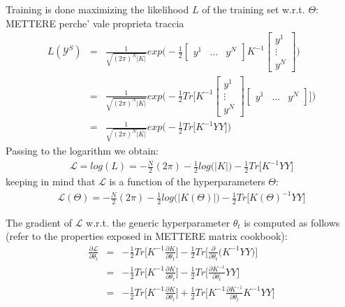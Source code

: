 \documentclass{article}
\begin{document}
Training is done maximizing the likelihood $L$ of the training set w.r.t. $\Theta$:
METTERE perche' vale proprieta traccia
\begin{eqnarray}
L(\mathcal{Y}^S) &=& 
\frac{1}{\sqrt{(2 \pi)^N \left | K \right | }}
exp \bigg ( - \frac{1}{2}
\begin{bmatrix} y^1 & \hdots & y^N \end{bmatrix} 
K^{-1}
\begin{bmatrix} y^1 \\ \vdots \\ y^N \end{bmatrix} 
\bigg ) \\
&=& 
\frac{1}{\sqrt{(2 \pi)^N \left | K \right | }}
exp \bigg ( - \frac{1}{2}
Tr \bigg [ 
K^{-1}
\begin{bmatrix} y^1 \\ \vdots \\ y^N \end{bmatrix} 
\begin{bmatrix} y^1 & \hdots & y^N \end{bmatrix} 
\bigg ]
\bigg ) \\
&=&
\frac{1}{\sqrt{(2 \pi)^N \left | K \right | }}
exp \bigg ( - \frac{1}{2}
Tr \bigg [ 
K^{-1}
YY
\bigg ]
\bigg )
\end{eqnarray}
Passing to the logarithm we obtain:
\begin{eqnarray}
\mathcal{L} = log(L) = 
-\frac{N}{2}(2 \pi) 
-\frac{1}{2} log \big (\left | K \right | \big )
-\frac{1}{2} Tr \bigg [
K^{-1} YY
\bigg ] 
\end{eqnarray}
keeping in mind that $\mathcal{L}$ is a function of the hyperparameters $\Theta$:
\begin{eqnarray}
\mathcal{L}(\Theta) = 
-\frac{N}{2}(2 \pi) 
-\frac{1}{2} log \big (\left | K(\Theta) \right | \big )
-\frac{1}{2} Tr \bigg [
K(\Theta)^{-1} YY
\bigg ] 
\end{eqnarray}

The gradient of $\mathcal{L}$ w.r.t. the generic hyperparameter $\theta_t$ is computed as follows (refer to the properties exposed in METTERE matrix cookbook):
\begin{eqnarray}
\frac{\partial \mathcal{L}}{\partial \theta_t} &=& 
-\frac{1}{2} Tr \bigg [ K^{-1} \frac{\partial K}{\partial \theta_t} \bigg ]
-\frac{1}{2} Tr \bigg [ \frac{\partial }{\partial \theta_t} \big (  
K^{-1} YY
\big ) \bigg ] \\
&=& -\frac{1}{2} Tr \bigg [ K^{-1} \frac{\partial K}{\partial \theta_t} \bigg ]
-\frac{1}{2} Tr \bigg [ \frac{\partial K^{-1}}{\partial \theta_t} YY \bigg ] \\
&=& -\frac{1}{2} Tr \bigg [ K^{-1} \frac{\partial K}{\partial \theta_t} \bigg ]
+\frac{1}{2} Tr \bigg [ K^{-1} \frac{\partial K^{-1}}{\partial \theta_t} K^{-1} YY \bigg ]
\end{eqnarray}
\end{document}
